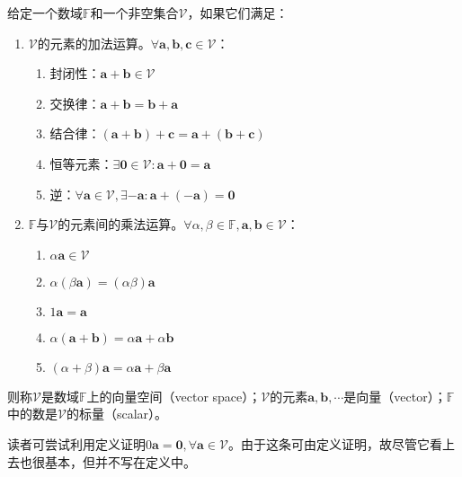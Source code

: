 \documentclass[../main.tex]{subfiles}
\begin{document}
\begin{definition}[向量空间]\label{def:II.2.1}
    给定一个数域$\mathbb{F}$和一个非空集合$\mathcal{V}$，如果它们满足：
    \begin{enumerate}
        \item $\mathcal{V}$的元素的加法运算。$\forall\mathbf{a},\mathbf{b},\mathbf{c}\in \mathcal{V}$：
              \begin{enumerate}
                  \item 封闭性：$\mathbf{a}+\mathbf{b}\in\mathcal{V}$
                  \item 交换律：$\mathbf{a}+\mathbf{b}=\mathbf{b}+\mathbf{a}$
                  \item 结合律：$\left(\mathbf{a}+\mathbf{b}\right)+\mathbf{c}=\mathbf{a}+\left(\mathbf{b}+\mathbf{c}\right)$
                  \item 恒等元素：$\exists \bm{0}\in\mathcal{V}:\mathbf{a}+\bm{0}=\mathbf{a}$
                  \item 逆：$\forall \mathbf{a}\in\mathcal{V},\exists -\mathbf{a}:\mathbf{a}+\left(-\mathbf{a}\right)=\bm{0}$
              \end{enumerate}
        \item $\mathbb{F}$与$\mathcal{V}$的元素间的乘法运算。$\forall\alpha,\beta\in\mathbb{F},\mathbf{a},\mathbf{b}\in\mathcal{V}$：
              \begin{enumerate}
                  \item $\alpha\mathbf{a}\in\mathcal{V}$
                  \item $\alpha\left(\beta\mathbf{a}\right)=\left(\alpha\beta\right)\mathbf{a}$
                  \item $1\mathbf{a}=\mathbf{a}$
                  \item $\alpha\left(\mathbf{a}+\mathbf{b}\right)=\alpha\mathbf{a}+\alpha\mathbf{b}$
                  \item $\left(\alpha+\beta\right)\mathbf{a}=\alpha\mathbf{a}+\beta\mathbf{a}$
              \end{enumerate}
    \end{enumerate}
    则称$\mathcal{V}$是数域$\mathbb{F}$上的向量空间（vector space）；$\mathcal{V}$的元素$\mathbf{a},\mathbf{b},\cdots$是向量（vector）；$\mathbb{F}$中的数是$\mathcal{V}$的标量（scalar）。
\end{definition}

读者可尝试利用定义证明$0\mathbf{a}=\mathbf{0},\forall\mathbf{a}\in\mathcal{V}$。由于这条可由定义证明，故尽管它看上去也很基本，但并不写在定义中。
\end{document}
